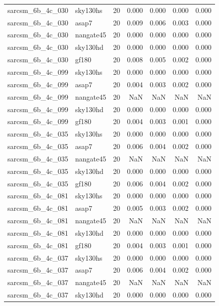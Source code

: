 \begin{tabular}{llrrrrr}
sarcsm\_6b\_4c\_030 & sky130hs & 20 & 0.000 & 0.000 & 0.000 & 0.000 \\
sarcsm\_6b\_4c\_030 & asap7 & 20 & 0.009 & 0.006 & 0.003 & 0.000 \\
sarcsm\_6b\_4c\_030 & nangate45 & 20 & 0.000 & 0.000 & 0.000 & 0.000 \\
sarcsm\_6b\_4c\_030 & sky130hd & 20 & 0.000 & 0.000 & 0.000 & 0.000 \\
sarcsm\_6b\_4c\_030 & gf180 & 20 & 0.008 & 0.005 & 0.002 & 0.000 \\
sarcsm\_6b\_4c\_099 & sky130hs & 20 & 0.000 & 0.000 & 0.000 & 0.000 \\
sarcsm\_6b\_4c\_099 & asap7 & 20 & 0.004 & 0.003 & 0.002 & 0.000 \\
sarcsm\_6b\_4c\_099 & nangate45 & 20 & NaN & NaN & NaN & NaN \\
sarcsm\_6b\_4c\_099 & sky130hd & 20 & 0.000 & 0.000 & 0.000 & 0.000 \\
sarcsm\_6b\_4c\_099 & gf180 & 20 & 0.004 & 0.003 & 0.001 & 0.000 \\
sarcsm\_6b\_4c\_035 & sky130hs & 20 & 0.000 & 0.000 & 0.000 & 0.000 \\
sarcsm\_6b\_4c\_035 & asap7 & 20 & 0.006 & 0.004 & 0.002 & 0.000 \\
sarcsm\_6b\_4c\_035 & nangate45 & 20 & NaN & NaN & NaN & NaN \\
sarcsm\_6b\_4c\_035 & sky130hd & 20 & 0.000 & 0.000 & 0.000 & 0.000 \\
sarcsm\_6b\_4c\_035 & gf180 & 20 & 0.006 & 0.004 & 0.002 & 0.000 \\
sarcsm\_6b\_4c\_081 & sky130hs & 20 & 0.000 & 0.000 & 0.000 & 0.000 \\
sarcsm\_6b\_4c\_081 & asap7 & 20 & 0.005 & 0.003 & 0.002 & 0.000 \\
sarcsm\_6b\_4c\_081 & nangate45 & 20 & NaN & NaN & NaN & NaN \\
sarcsm\_6b\_4c\_081 & sky130hd & 20 & 0.000 & 0.000 & 0.000 & 0.000 \\
sarcsm\_6b\_4c\_081 & gf180 & 20 & 0.004 & 0.003 & 0.001 & 0.000 \\
sarcsm\_6b\_4c\_037 & sky130hs & 20 & 0.000 & 0.000 & 0.000 & 0.000 \\
sarcsm\_6b\_4c\_037 & asap7 & 20 & 0.006 & 0.004 & 0.002 & 0.000 \\
sarcsm\_6b\_4c\_037 & nangate45 & 20 & NaN & NaN & NaN & NaN \\
sarcsm\_6b\_4c\_037 & sky130hd & 20 & 0.000 & 0.000 & 0.000 & 0.000 \\

\end{tabular}
